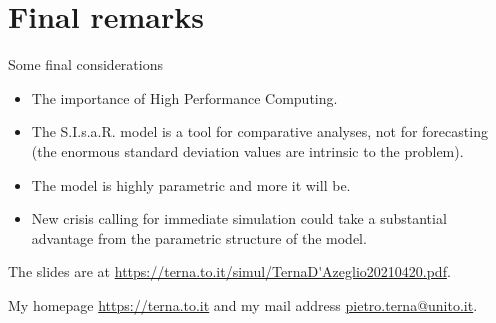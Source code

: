 \documentclass[8pt]{beamer}
\begin{document}
\section{Final remarks}

\begin{frame}{Some final considerations}

\begin{itemize}

\item
The importance of High Performance Computing.

\bigskip

\item The S.I.s.a.R. model is a tool for comparative analyses, not for forecasting (the enormous standard deviation values are intrinsic to the problem).


\item The model is highly parametric and more it will be.

\item New crisis calling for immediate simulation could take a substantial advantage from the parametric structure of the model.

\end{itemize}

 \bigskip
 The slides are at \url{https://terna.to.it/simul/TernaD'Azeglio20210420.pdf}.
 
 My homepage \url{https://terna.to.it} and my mail address \url{pietro.terna@unito.it}.
 
\end{frame}
\end{document}
